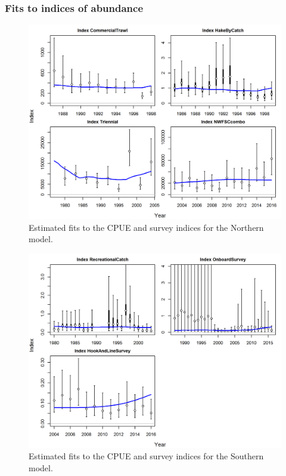 \documentclass[12pt,]{article}
\begin{document}
\newpage

\subsubsection{Fits to indices of
abundance}\label{fits-to-indices-of-abundance}

\begin{figure}[htbp]
\centering
\includegraphics{r4ss/plots_mod1/index0_all_indices_fit.png}
\caption{Estimated fits to the CPUE and survey indices for the Northern
model. \label{fig:index_fits1}}
\end{figure}

\begin{figure}[htbp]
\centering
\includegraphics{r4ss/plots_mod2/index0_all_indices_fit.png}
\caption{Estimated fits to the CPUE and survey indices for the Southern
model. \label{fig:index_fits2}}
\end{figure}
\end{document}
